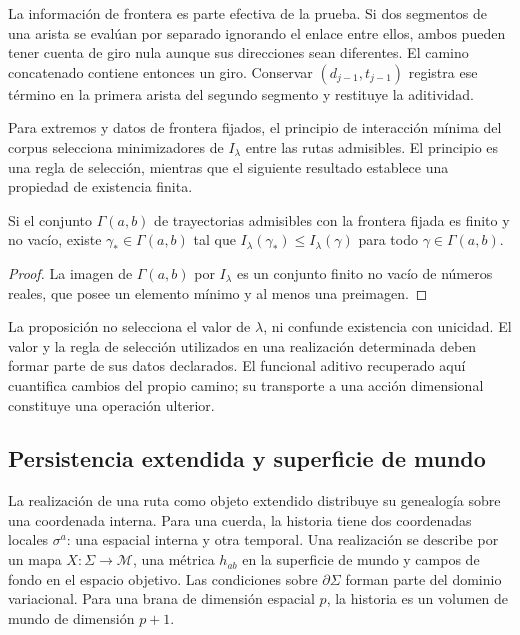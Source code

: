 La información de frontera es parte efectiva de la prueba.
Si dos segmentos de una arista se evalúan por separado
ignorando el enlace entre ellos, ambos pueden tener cuenta
de giro nula aunque sus direcciones sean diferentes. El
camino concatenado contiene entonces un giro. Conservar
\((d_{j-1},t_{j-1})\) registra ese término en la primera
arista del segundo segmento y restituye la aditividad.

Para extremos y datos de frontera fijados, el principio de
interacción mínima del corpus selecciona minimizadores de
\(I_\lambda\) entre las rutas admisibles. El principio
es una regla de selección, mientras que el siguiente
resultado establece una propiedad de existencia finita.

\begin{proposition}
Si el conjunto \(\Gamma(a,b)\) de trayectorias admisibles
con la frontera fijada es finito y no vacío, existe
\(\gamma_*\in\Gamma(a,b)\) tal que
\(I_\lambda(\gamma_*)\leq I_\lambda(\gamma)\)
para todo \(\gamma\in\Gamma(a,b)\).
\end{proposition}
\begin{proof}
La imagen de \(\Gamma(a,b)\) por \(I_\lambda\) es
un conjunto finito no vacío de números reales, que posee
un elemento mínimo y al menos una preimagen.
\end{proof}

La proposición no selecciona el valor de \(\lambda\),
ni confunde existencia con unicidad. El valor y la regla
de selección utilizados en una realización determinada
deben formar parte de sus datos declarados. El funcional
aditivo recuperado aquí cuantifica cambios del propio
camino; su transporte a una acción dimensional constituye
una operación ulterior.

\subsection{Persistencia extendida y superficie de mundo}

La realización de una ruta como objeto extendido distribuye
su genealogía sobre una coordenada interna. Para una cuerda,
la historia tiene dos coordenadas locales \(\sigma^a\):
una espacial interna y otra temporal. Una realización se
describe por un mapa \(X:\Sigma\to\mathcal M\), una
métrica \(h_{ab}\) en la superficie de mundo y campos
de fondo en el espacio objetivo. Las condiciones sobre
\(\partial\Sigma\) forman parte del dominio variacional.
Para una brana de dimensión espacial \(p\), la historia
es un volumen de mundo de dimensión \(p+1\).

